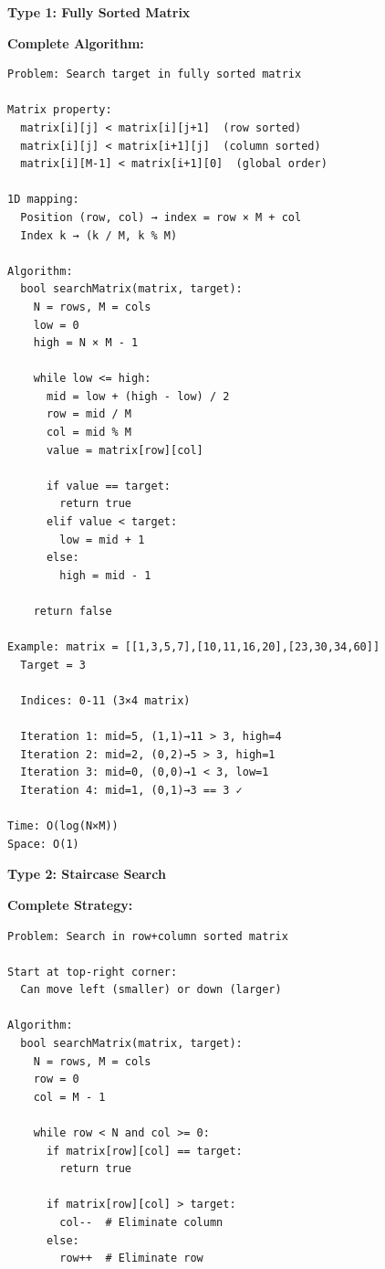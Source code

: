 \documentclass[11pt,a4paper,oneside]{book}
\begin{document}
\begin{tcolorbox}[
    enhanced,breakable,
    colback=successgreen!10,
    colframe=successgreen,
    boxrule=1.5pt,
    arc=3mm,
    title=\textbf{Complete Matrix Search Algorithms}
]
\textbf{Type 1: Fully Sorted Matrix}

\textbf{Complete Algorithm:}
\begin{verbatim}
Problem: Search target in fully sorted matrix

Matrix property:
  matrix[i][j] < matrix[i][j+1]  (row sorted)
  matrix[i][j] < matrix[i+1][j]  (column sorted)
  matrix[i][M-1] < matrix[i+1][0]  (global order)

1D mapping:
  Position (row, col) → index = row × M + col
  Index k → (k / M, k % M)

Algorithm:
  bool searchMatrix(matrix, target):
    N = rows, M = cols
    low = 0
    high = N × M - 1
    
    while low <= high:
      mid = low + (high - low) / 2
      row = mid / M
      col = mid % M
      value = matrix[row][col]
      
      if value == target:
        return true
      elif value < target:
        low = mid + 1
      else:
        high = mid - 1
    
    return false

Example: matrix = [[1,3,5,7],[10,11,16,20],[23,30,34,60]]
  Target = 3
  
  Indices: 0-11 (3×4 matrix)
  
  Iteration 1: mid=5, (1,1)→11 > 3, high=4
  Iteration 2: mid=2, (0,2)→5 > 3, high=1  
  Iteration 3: mid=0, (0,0)→1 < 3, low=1
  Iteration 4: mid=1, (0,1)→3 == 3 ✓

Time: O(log(N×M))
Space: O(1)
\end{verbatim}

\textbf{Type 2: Staircase Search}

\textbf{Complete Strategy:}
\begin{verbatim}
Problem: Search in row+column sorted matrix

Start at top-right corner:
  Can move left (smaller) or down (larger)
  
Algorithm:
  bool searchMatrix(matrix, target):
    N = rows, M = cols
    row = 0
    col = M - 1
    
    while row < N and col >= 0:
      if matrix[row][col] == target:
        return true
      
      if matrix[row][col] > target:
        col--  # Eliminate column
      else:
        row++  # Eliminate row
    

\end{verbatim}
\end{tcolorbox}
\end{document}
